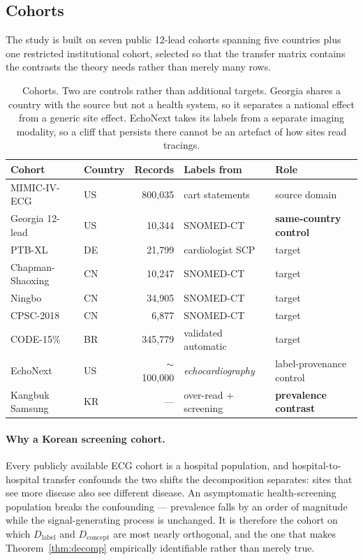 \subsection{Cohorts}

The study is built on seven public 12-lead cohorts spanning five countries plus
one restricted institutional cohort, selected so that the transfer matrix
contains the contrasts the theory needs rather than merely many rows.

\begin{table}[t]
\centering\small
\begin{tabular}{llrll}
\toprule
Cohort & Country & Records & Labels from & Role \\
\midrule
MIMIC-IV-ECG      & US & 800{,}035 & cart statements      & source domain \\
Georgia 12-lead   & US & 10{,}344  & SNOMED-CT            & \textbf{same-country control} \\
PTB-XL            & DE & 21{,}799  & cardiologist SCP     & target \\
Chapman-Shaoxing  & CN & 10{,}247  & SNOMED-CT            & target \\
Ningbo            & CN & 34{,}905  & SNOMED-CT            & target \\
CPSC-2018         & CN & 6{,}877   & SNOMED-CT            & target \\
CODE-15\%         & BR & 345{,}779 & validated automatic  & target \\
EchoNext          & US & $\sim$100{,}000 & \emph{echocardiography} & label-provenance control \\
Kangbuk Samsung   & KR & ---       & over-read + screening & \textbf{prevalence contrast} \\
\bottomrule
\end{tabular}
\caption{Cohorts. Two are controls rather than additional targets. Georgia
shares a country with the source but not a health system, so it separates a
national effect from a generic site effect. EchoNext takes its labels from a
separate imaging modality, so a cliff that persists there cannot be an artefact
of how sites read tracings.}
\label{tab:cohorts}
\end{table}

\paragraph{Why a Korean screening cohort.}
Every publicly available ECG cohort is a hospital population, and
hospital-to-hospital transfer confounds the two shifts the decomposition
separates: sites that see more disease also see different disease.  An
asymptomatic health-screening population breaks the confounding --- prevalence
falls by an order of magnitude while the signal-generating process is
unchanged.  It is therefore the cohort on which $D_{\mathrm{label}}$ and
$D_{\mathrm{concept}}$ are most nearly orthogonal, and the one that makes
Theorem~\ref{thm:decomp} empirically identifiable rather than merely true.


